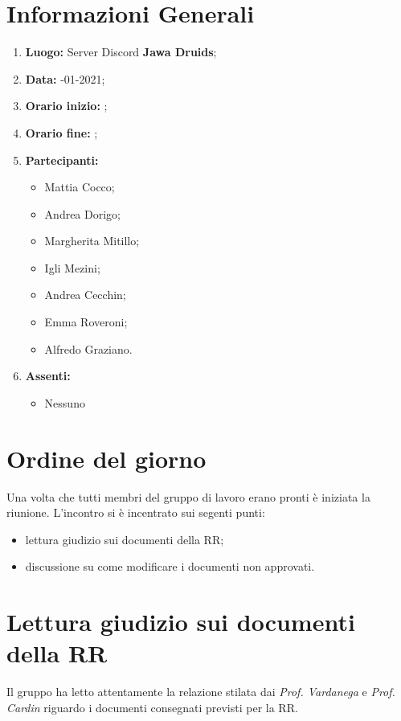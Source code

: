 \newpage
\section{Informazioni Generali}
\begin{enumerate}
  \item \textbf{Luogo:} \normalfont Server Discord \textbf{Jawa Druids};
  \item \textbf{Data:} -01-2021;
  \item \textbf{Orario inizio:} ;
  \item \textbf{Orario fine:} ;
  \item \textbf{Partecipanti:}
  \begin{itemize}
    \item Mattia Cocco;
    \item Andrea Dorigo;
    \item Margherita Mitillo;
    \item Igli Mezini;
    \item Andrea Cecchin;
    \item Emma Roveroni;
    \item Alfredo Graziano.
  \end{itemize}
  \item \textbf{Assenti:}
  \begin{itemize}
    \item Nessuno
  \end{itemize}
\end{enumerate}
\section{Ordine del giorno}
Una volta che tutti membri del gruppo di lavoro erano pronti è iniziata la riunione. L'incontro si è incentrato sui segenti punti:
\begin{itemize}
  \item lettura giudizio sui documenti della RR;
  \item discussione su come modificare i documenti non approvati.
\end{itemize}

\section{Lettura giudizio sui documenti della RR}
Il gruppo ha letto attentamente la relazione stilata dai \textit{Prof. Vardanega} e \textit{Prof. Cardin} riguardo i documenti consegnati previsti per la RR.


